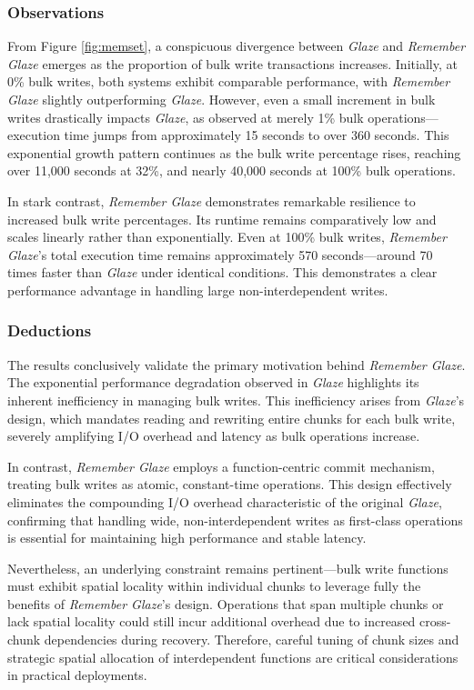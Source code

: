 \documentclass[conference]{IEEEtran}
\begin{document}
\subsubsection{Observations}
From Figure \ref{fig:memset}, a conspicuous divergence between \textit{Glaze} and \textit{Remember Glaze} emerges as the proportion of bulk write transactions increases. Initially, at 0\% bulk writes, both systems exhibit comparable performance, with \textit{Remember Glaze} slightly outperforming \textit{Glaze}. However, even a small increment in bulk writes drastically impacts \textit{Glaze}, as observed at merely 1\% bulk operations—execution time jumps from approximately 15 seconds to over 360 seconds. This exponential growth pattern continues as the bulk write percentage rises, reaching over 11,000 seconds at 32\%, and nearly 40,000 seconds at 100\% bulk operations.

In stark contrast, \textit{Remember Glaze} demonstrates remarkable resilience to increased bulk write percentages. Its runtime remains comparatively low and scales linearly rather than exponentially. Even at 100\% bulk writes, \textit{Remember Glaze}'s total execution time remains approximately 570 seconds—around 70 times faster than \textit{Glaze} under identical conditions. This demonstrates a clear performance advantage in handling large non-interdependent writes.

\subsubsection{Deductions}
The results conclusively validate the primary motivation behind \textit{Remember Glaze}. The exponential performance degradation observed in \textit{Glaze} highlights its inherent inefficiency in managing bulk writes. This inefficiency arises from \textit{Glaze}'s design, which mandates reading and rewriting entire chunks for each bulk write, severely amplifying I/O overhead and latency as bulk operations increase.

In contrast, \textit{Remember Glaze} employs a function-centric commit mechanism, treating bulk writes as atomic, constant-time operations. This design effectively eliminates the compounding I/O overhead characteristic of the original \textit{Glaze}, confirming that handling wide, non-interdependent writes as first-class operations is essential for maintaining high performance and stable latency.

Nevertheless, an underlying constraint remains pertinent—bulk write functions must exhibit spatial locality within individual chunks to leverage fully the benefits of \textit{Remember Glaze}'s design. Operations that span multiple chunks or lack spatial locality could still incur additional overhead due to increased cross-chunk dependencies during recovery. Therefore, careful tuning of chunk sizes and strategic spatial allocation of interdependent functions are critical considerations in practical deployments.
\end{document}

